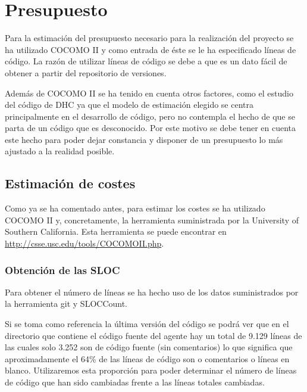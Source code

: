 \chapter{Presupuesto}

Para la estimación del presupuesto necesario para la realización del proyecto se ha utilizado COCOMO II y como entrada de éste se le ha especificado líneas de código. La razón de utilizar líneas de código se debe a que es un dato fácil de obtener a partir del repositorio de versiones.

Además de COCOMO II se ha tenido en cuenta otros factores, como el estudio del código de DHC ya que el modelo de estimación elegido se centra principalmente en el desarrollo de código, pero no contempla el hecho de que se parta de un código que es desconocido. Por este motivo se debe tener en cuenta este hecho para poder dejar constancia y disponer de un presupuesto lo más ajustado a la realidad posible.

\section{Estimación de costes}

Como ya se ha comentado antes, para estimar los costes se ha utilizado COCOMO II y, concretamente, la herramienta suministrada por la University of Southern California. Esta herramienta se puede encontrar en \url{http://csse.usc.edu/tools/COCOMOII.php}.

\subsection{Obtención de las SLOC}

Para obtener el número de líneas se ha hecho uso de los datos suministrados por la herramienta git y SLOCCount.

Si se toma como referencia la última versión del código se podrá ver que en el directorio que contiene el código fuente del agente hay un total de 9.129 líneas de las cuales solo 3.252 son de código fuente (sin comentarios) lo que significa que aproximadamente el 64\% de las líneas de código son o comentarios o líneas en blanco. Utilizaremos esta proporción para poder determinar el número de líneas de código que han sido cambiadas frente a las líneas totales cambiadas.

